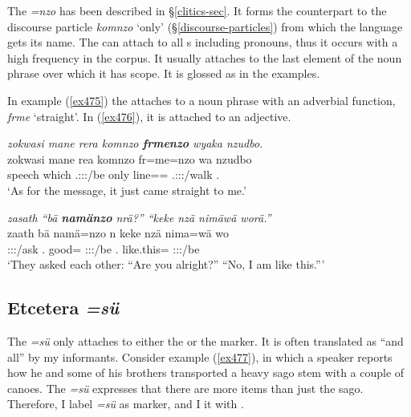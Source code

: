 The   \emph{=nzo} has been described in {\S}\ref{clitics-sec}. It forms the  counterpart to the discourse particle \emph{komnzo} `only' ({\S}\ref{discourse-particles}) from which the language gets its name. The   can attach to all s including pronouns, thus it occurs with a high frequency in the corpus. It usually attaches to the last element of the noun phrase over which it has scope. It is glossed as {\Only} in the examples.

In example (\ref{ex475}) the   attaches to a noun phrase with an adverbial function, \emph{frme} `straight'. In (\ref{ex476}), it is attached to an adjective.

\begin{exe}
	\ex \emph{zokwasi mane rera komnzo \textbf{frmenzo} wyaka nzudbo.}\\
	\gll zokwasi mane rea komnzo fr=me=nzo wa nzudbo\\
	speech which \Tsg.\F:\Sbj:\Pst:\Ipfv/be only line=\Ins={\Only} \Tsg.\F:\Sbj:\Pst:\Ipfv/walk \Fsg.{\All}\\
	\trans `As for the message, it just came straight to me.'
	\label{ex475}
\end{exe}
\begin{exe}
	\ex \emph{zasath ``bä \textbf{namänzo} nrä?'' ``keke nzä nimäwä worä.''}\\
	\gll zaath bä namä=nzo n keke nzä nima=wä wo\\
	\Stdu:\Sbj:\Pst:\Pfv/ask \Second.{\Abs} good={\Only} \Ssg:\Sbj:\Nonpast:\Ipfv/be {\Neg} \Fsg.{\Abs} {like.this}={\Emph} \Fsg:\Sbj:\Nonpast:\Ipfv/be\\
	\trans `They asked each other: ``Are you alright?'' ``No, I am like this.'''\\
	\label{ex476}
\end{exe}

\subsection{Etcetera \emph{=sü}} \label{etceterasue}

The  \emph{=sü} only attaches to either the  or the   marker. It is often translated as ``and all'' by my informants. Consider example (\ref{ex477}), in which a speaker reports how he and some of his brothers transported a heavy sago stem with a couple of canoes. The \emph{=sü}  expresses that there are more items than just the sago. Therefore, I label \emph{=sü} as  marker, and I  it with \Etc.

